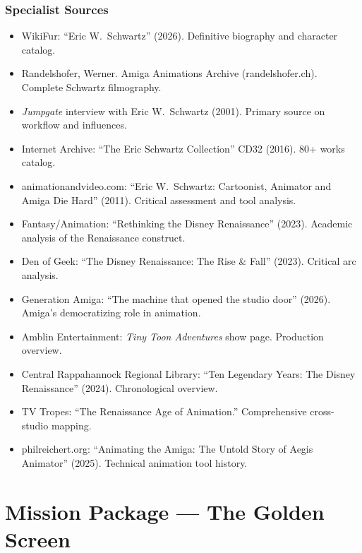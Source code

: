 \documentclass[11pt,letterpaper]{article}
\newcommand{\stageheader}[2]{%
  \noindent\colorbox{#2}{\makebox[\textwidth][l]{%
    \textcolor{white}{\bfseries\sffamily\hspace{6pt}#1\hspace{6pt}}}}%
  \vspace{0.5em}\par%
}
\begin{document}
\subsubsection{Specialist Sources}

\begin{itemize}[leftmargin=2em]
  \item WikiFur: ``Eric W.\ Schwartz'' (2026). Definitive biography and character catalog.
  \item Randelshofer, Werner. Amiga Animations Archive (randelshofer.ch). Complete Schwartz filmography.
  \item \textit{Jumpgate} interview with Eric W.\ Schwartz (2001). Primary source on workflow and influences.
  \item Internet Archive: ``The Eric Schwartz Collection'' CD32 (2016). 80+ works catalog.
  \item animationandvideo.com: ``Eric W.\ Schwartz: Cartoonist, Animator and Amiga Die Hard'' (2011). Critical assessment and tool analysis.
  \item Fantasy/Animation: ``Rethinking the Disney Renaissance'' (2023). Academic analysis of the Renaissance construct.
  \item Den of Geek: ``The Disney Renaissance: The Rise \& Fall'' (2023). Critical arc analysis.
  \item Generation Amiga: ``The machine that opened the studio door'' (2026). Amiga's democratizing role in animation.
  \item Amblin Entertainment: \textit{Tiny Toon Adventures} show page. Production overview.
  \item Central Rappahannock Regional Library: ``Ten Legendary Years: The Disney Renaissance'' (2024). Chronological overview.
  \item TV Tropes: ``The Renaissance Age of Animation.'' Comprehensive cross-studio mapping.
  \item philreichert.org: ``Animating the Amiga: The Untold Story of Aegis Animator'' (2025). Technical animation tool history.
\end{itemize}

\newpage

\stageheader{STAGE 3 --- MISSION PACKAGE}{tertiary}

\section{Mission Package --- The Golden Screen}
\end{document}
